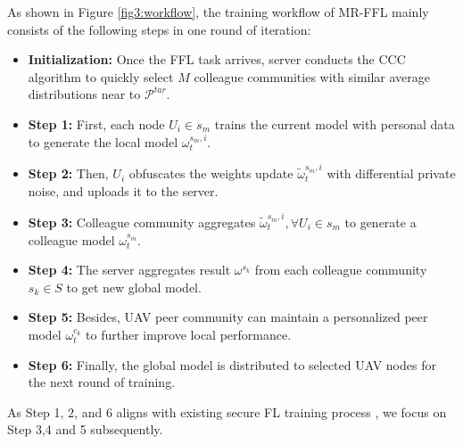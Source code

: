 \documentclass[lettersize,journal]{IEEEtran}
\begin{document}
As shown in Figure \ref{fig3:workflow}, the training workflow of MR-FFL mainly consists of the following steps in one round of iteration:


\begin{itemize}
    \item \textbf{Initialization:} Once the FFL task arrives, server conducts the CCC algorithm to quickly select $M$ colleague communities with similar average distributions near to $\mathcal{P}^{tar}$.
    \item \textbf{Step 1:} First, each node $U_i \in s_m$ trains the current model with personal data to generate the local model $\omega_t^{s_m, i}$.
    \item \textbf{Step 2:} Then, $U_i$ obfuscates the weights update $\widetilde{\omega}_{t}^{s_{m}, i}$ with differential private noise, and uploads it to the server.
    \item \textbf{Step 3:} Colleague community aggregates $\widetilde{\omega}_{t}^{s_{m}, i}, \forall U_i \in s_m$ to generate a colleague model $\omega_{t}^{s_{m}}$.
    \item \textbf{Step 4:} The server aggregates result $\omega^{s_k}$ from each colleague community $s_k \in S$ to get new global model.
    \item \textbf{Step 5:} Besides, UAV peer community can maintain a personalized peer model $\omega_{t}^{c_{k}}$ to further improve local performance. 
    \item \textbf{Step 6:} Finally, the global model is distributed to selected UAV nodes for the next round of training.
\end{itemize}

As Step 1, 2, and 6 aligns with existing secure FL training process \cite{wei2020federated-NbAFL,padala2021federated}, we focus on Step 3,4 and 5 subsequently.
\end{document}
